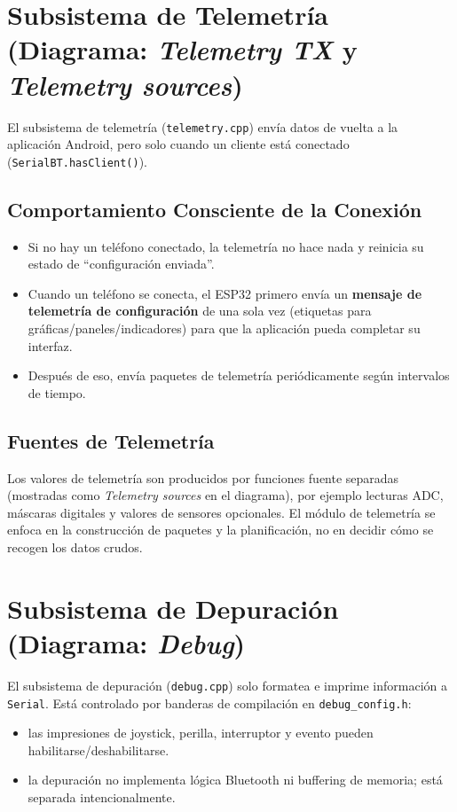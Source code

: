 \section{Subsistema de Telemetría (Diagrama: \textit{Telemetry TX} y \textit{Telemetry sources})}

El subsistema de telemetría (\texttt{telemetry.cpp}) envía datos de vuelta a la aplicación Android, pero solo cuando un cliente está conectado
(\texttt{SerialBT.hasClient()}).

\subsection{Comportamiento Consciente de la Conexión}
\begin{itemize}
    \item Si no hay un teléfono conectado, la telemetría no hace nada y reinicia su estado de ``configuración enviada''.
    \item Cuando un teléfono se conecta, el ESP32 primero envía un \textbf{mensaje de telemetría de configuración} de una sola vez
    (etiquetas para gráficas/paneles/indicadores) para que la aplicación pueda completar su interfaz.
    \item Después de eso, envía paquetes de telemetría periódicamente según intervalos de tiempo.
\end{itemize}

\subsection{Fuentes de Telemetría}
Los valores de telemetría son producidos por funciones fuente separadas (mostradas como \textit{Telemetry sources} en el diagrama),
por ejemplo lecturas ADC, máscaras digitales y valores de sensores opcionales.
El módulo de telemetría se enfoca en la construcción de paquetes y la planificación, no en decidir cómo se recogen los datos crudos.

\section{Subsistema de Depuración (Diagrama: \textit{Debug})}

El subsistema de depuración (\texttt{debug.cpp}) solo formatea e imprime información a \texttt{Serial}.
Está controlado por banderas de compilación en \texttt{debug\_config.h}:

\begin{itemize}
    \item las impresiones de joystick, perilla, interruptor y evento pueden habilitarse/deshabilitarse.
    \item la depuración no implementa lógica Bluetooth ni buffering de memoria; está separada intencionalmente.
\end{itemize}

